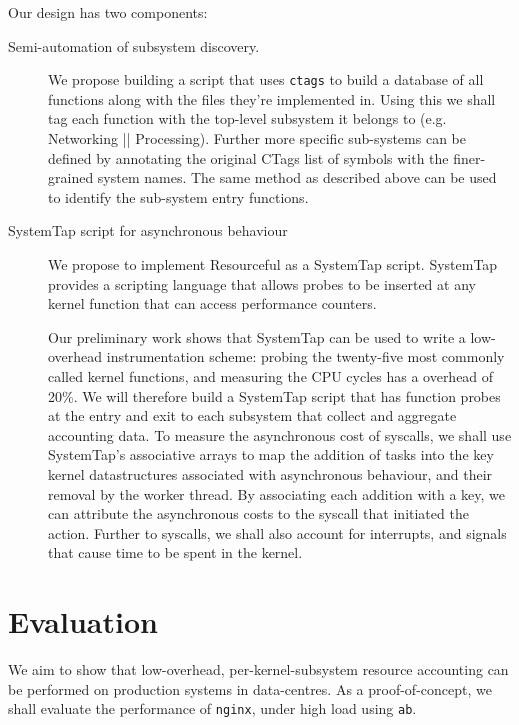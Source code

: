 \documentclass{article}
\begin{document}
Our design has two components:

\begin{description}
\item[Semi-automation of subsystem discovery.]
  We propose building a script that uses \texttt{ctags} to build a database of all functions along with the files they're implemented in.
  Using this we shall tag each function with the top-level subsystem it belongs to (e.g. Networking || Processing).
  Further more specific sub-systems can be defined by annotating the original CTags list of symbols with the finer-grained system names.
  The same method as described above can be used to identify the sub-system entry functions.


\item[SystemTap script for asynchronous behaviour]

  We propose to implement Resourceful as a SystemTap script.
SystemTap provides a scripting language that allows probes to be inserted at any kernel function that can access performance counters.

Our preliminary work shows that SystemTap can be used to write a low-overhead instrumentation scheme: probing the twenty-five most commonly called kernel functions, and measuring the CPU cycles has a overhead of 20\%.
We will therefore build a SystemTap script that has function probes at the entry and exit to each subsystem that collect and aggregate accounting data.
To measure the asynchronous cost of syscalls, we shall use SystemTap's associative arrays to map the addition of tasks into the key kernel datastructures associated with asynchronous behaviour, and their removal by the worker thread.
By associating each addition with a key, we can attribute the asynchronous costs to the syscall that initiated the action.
Further to syscalls, we shall also account for interrupts, and signals that cause time to be spent in the kernel. 


\end{description}

\section{Evaluation}

We aim to show that low-overhead, per-kernel-subsystem resource accounting can be performed on production systems in data-centres.
As a proof-of-concept, we shall evaluate the performance of \texttt{nginx}, under high load using \texttt{ab}.
\end{document}
